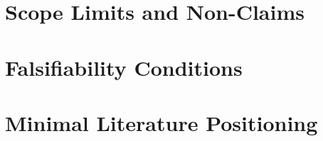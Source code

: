 ﻿\documentclass[11pt]{article}
\theoremstyle{plain}
\theoremstyle{definition}
\theoremstyle{remark}
\begin{document}
\section{Scope Limits and Non-Claims}


\section{Falsifiability Conditions}


\section{Minimal Literature Positioning}


\nocite{*}



\end{document}
